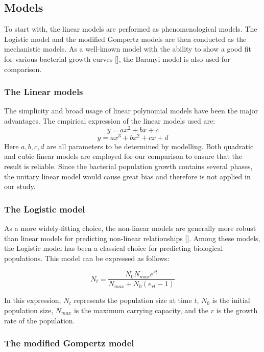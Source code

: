 \documentclass[11pt, oneside]{article}
\begin{document}
 		\subsection{Models}
 
 		To start with, the linear models are performed as phenomenological models.  The Logistic model and the modified Gompertz models are then conducted as the mechanistic models. As a well-known model with the ability to show a good fit for various bacterial growth curves [\cite{yilmaz2011identifiability}], the Baranyi model is also used for comparison.
		
			\subsubsection{The Linear models}
			
			The simplicity and broad usage of linear polynomial models have been the major advantages. The empirical expression of the linear models used are:
			\[y = ax^2 + bx + c\]
			\[y = ax^3 + bx^2 + cx + d\]
			\noindent Here \(a, b, c, d\) are all parameters to be determined by modelling. Both quadratic and cubic linear models are employed for our comparison to ensure that the result is reliable. Since the bacterial population growth contains several phases, the unitary linear model would cause great bias and therefore is not applied in our study.
			
 			\subsubsection{The Logistic model}
			
			As a more widely-fitting choice, the non-linear models are generally more robust than linear models for predicting non-linear relationships [\cite{archontoulis2015nonlinear}]. Among these models, the Logistic model has been a classical choice for predicting biological populations. This model can be expressed as follows:
			
			\[N_t = \frac{N_0 N_{max} e^{rt}}{N_{max} + N_0(e_{rt} - 1)}\]
			
			\bigbreak
			\noindent In this expression, \(N_t\) represents the population size at time \(t\), \(N_0\) is the initial population size, \(N_{max}\) is the maximum carrying capacity, and the \(r\) is the growth rate of the population. 
			
			\subsubsection{The modified Gompertz model}
			
\end{document}
